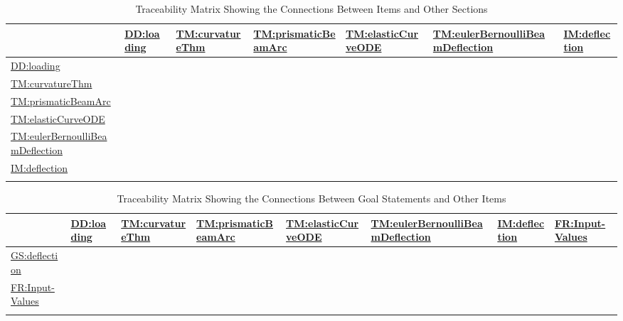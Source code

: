 \documentclass[12pt]{article}
\begin{document}
\begin{longtable}{l l l l l l l}
\toprule
\textbf{} & \textbf{\hyperref[DD:loading]{DD:loading}} & \textbf{\hyperref[TM:curvatureThm]{TM:curvatureThm}} & \textbf{\hyperref[TM:prismaticBeamArc]{TM:prismaticBeamArc}} & \textbf{\hyperref[TM:elasticCurveODE]{TM:elasticCurveODE}} & \textbf{\hyperref[TM:eulerBernoulliBeamDeflection]{TM:eulerBernoulliBeamDeflection}} & \textbf{\hyperref[IM:deflection]{IM:deflection}}
\\
\midrule
\endhead
\hyperref[DD:loading]{DD:loading} &  &  &  &  &  & 
\\
\hyperref[TM:curvatureThm]{TM:curvatureThm} &  &  &  &  &  & 
\\
\hyperref[TM:prismaticBeamArc]{TM:prismaticBeamArc} &  &  &  &  &  & 
\\
\hyperref[TM:elasticCurveODE]{TM:elasticCurveODE} &  &  &  &  &  & 
\\
\hyperref[TM:eulerBernoulliBeamDeflection]{TM:eulerBernoulliBeamDeflection} &  &  &  &  &  & 
\\
\hyperref[IM:deflection]{IM:deflection} &  &  &  &  &  & 
\\
\bottomrule
\caption{Traceability Matrix Showing the Connections Between Items and Other Sections}
\label{Table:TraceMatRefvsRef}
\end{longtable}
\begin{longtable}{l l l l l l l l}
\toprule
\textbf{} & \textbf{\hyperref[DD:loading]{DD:loading}} & \textbf{\hyperref[TM:curvatureThm]{TM:curvatureThm}} & \textbf{\hyperref[TM:prismaticBeamArc]{TM:prismaticBeamArc}} & \textbf{\hyperref[TM:elasticCurveODE]{TM:elasticCurveODE}} & \textbf{\hyperref[TM:eulerBernoulliBeamDeflection]{TM:eulerBernoulliBeamDeflection}} & \textbf{\hyperref[IM:deflection]{IM:deflection}} & \textbf{\hyperref[inputValues]{FR:Input-Values}}
\\
\midrule
\endhead
\hyperref[deflection]{GS:deflection} &  &  &  &  &  &  & 
\\
\hyperref[inputValues]{FR:Input-Values} &  &  &  &  &  &  & 
\\
\bottomrule
\caption{Traceability Matrix Showing the Connections Between Goal Statements and Other Items}
\label{Table:TraceMatAllvsR}
\end{longtable}
\end{document}
